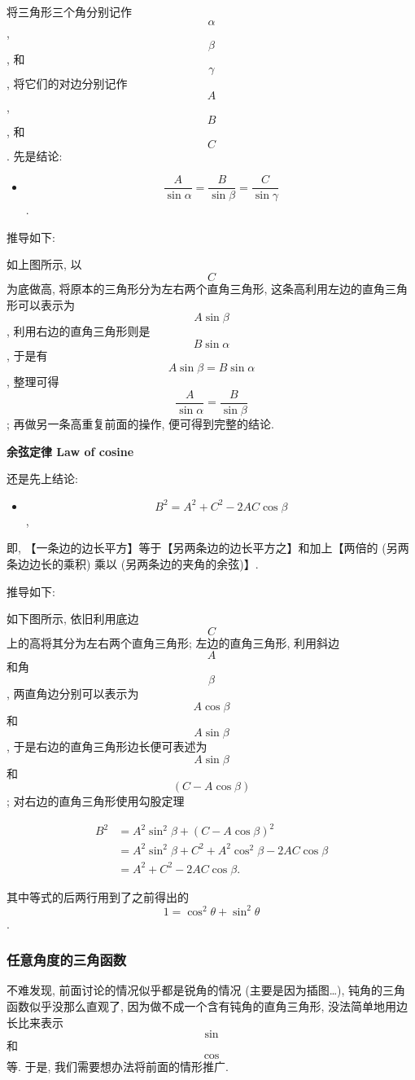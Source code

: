 将三角形三个角分别记作 \[\alpha\], \[\beta\], 和 \[\gamma\],
将它们的对边分别记作 \[A\], \[B\], 和 \[C\]. 先是结论:

\begin{itemize}
\tightlist
\item
  \[\boxed{\frac{A}{\sin\alpha}=\frac{B}{\sin\beta}=\frac{C}{\sin\gamma}}\].
\end{itemize}

推导如下:

如上图所示, 以 \[C\] 为底做高, 将原本的三角形分为左右两个直角三角形,
这条高利用左边的直角三角形可以表示为 \[A\sin\beta\],
利用右边的直角三角形则是 \[B\sin\alpha\], 于是有
\[A\sin\beta=B\sin\alpha\], 整理可得
\[\frac{A}{\sin\alpha}=\frac{B}{\sin\beta}\];
再做另一条高重复前面的操作, 便可得到完整的结论.

\textbf{余弦定律 Law of cosine}

还是先上结论:

\begin{itemize}
\tightlist
\item
  \[\boxed{B^2=A^2+C^2-2AC\cos\beta}\],
\end{itemize}

即, 【一条边的边长平方】等于【另两条边的边长平方之】和加上【两倍的
(另两条边边长的乘积) 乘以 (另两条边的夹角的余弦)】.

推导如下:

如下图所示, 依旧利用底边 \[C\] 上的高将其分为左右两个直角三角形;
左边的直角三角形, 利用斜边 \[A\] 和角 \[\beta\], 两直角边分别可以表示为
\[A\cos\beta\] 和 \[A\sin\beta\], 于是右边的直角三角形边长便可表述为
\[A\sin\beta\] 和 \[(C-A\cos\beta)\]; 对右边的直角三角形使用勾股定理

\[\begin{align*}B^2&=A^2\sin^2\beta+(C-A\cos\beta)^2\\
&=A^2\sin^2\beta+C^2+A^2\cos^2\beta-2AC\cos\beta\\
&=A^2+C^2-2AC\cos\beta.\end{align*}\]

其中等式的后两行用到了之前得出的 \[1=\cos^2\theta+\sin^2\theta\].

\hypertarget{ux4efbux610fux89d2ux5ea6ux7684ux4e09ux89d2ux51fdux6570}{%
\subsubsection{任意角度的三角函数}\label{ux4efbux610fux89d2ux5ea6ux7684ux4e09ux89d2ux51fdux6570}}

不难发现, 前面讨论的情况似乎都是锐角的情况 (主要是因为插图\ldots),
钝角的三角函数似乎没那么直观了, 因为做不成一个含有钝角的直角三角形,
没法简单地用边长比来表示 \[\sin\] 和 \[\cos\] 等. 于是,
我们需要想办法将前面的情形推广.

